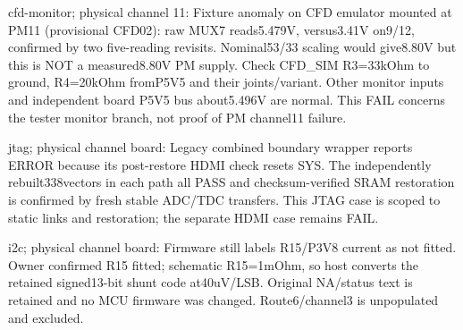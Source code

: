 cfd-\allowbreak{}monito\allowbreak{}r; physic\allowbreak{}al channe\allowbreak{}l 11: Fixtur\allowbreak{}e anomal\allowbreak{}y on CFD emulat\allowbreak{}or mounte\allowbreak{}d at PM11 (provis\allowbreak{}ional CFD02): raw MUX7 reads5\allowbreak{}.479V,\allowbreak{} versus\allowbreak{}3.41V on9/\allowbreak{}12,\allowbreak{} confir\allowbreak{}med by two five-\allowbreak{}readin\allowbreak{}g revisi\allowbreak{}ts. Nomina\allowbreak{}l53/\allowbreak{}33 scalin\allowbreak{}g would give8.80V but this is NOT a measur\allowbreak{}ed8.80V PM supply\allowbreak{}. Check CFD\_\allowbreak{}SIM R3=33kOhm\allowbreak{} to ground\allowbreak{},\allowbreak{} R4=20kOhm\allowbreak{} fromP5\allowbreak{}V5 and their joints\allowbreak{}/\allowbreak{}varian\allowbreak{}t. Other monito\allowbreak{}r inputs\allowbreak{} and indepe\allowbreak{}ndent board P5V5 bus about5\allowbreak{}.496V are normal\allowbreak{}. This FAIL concer\allowbreak{}ns the tester\allowbreak{} monito\allowbreak{}r branch\allowbreak{},\allowbreak{} not proof of PM channe\allowbreak{}l11 failur\allowbreak{}e.

jtag; physic\allowbreak{}al channe\allowbreak{}l board: Legacy\allowbreak{} combin\allowbreak{}ed bounda\allowbreak{}ry wrappe\allowbreak{}r report\allowbreak{}s ERROR becaus\allowbreak{}e its post-\allowbreak{}restor\allowbreak{}e HDMI check resets\allowbreak{} SYS. The indepe\allowbreak{}ndentl\allowbreak{}y rebuil\allowbreak{}t338ve\allowbreak{}ctors in each path all PASS and checks\allowbreak{}um-\allowbreak{}verifi\allowbreak{}ed SRAM restor\allowbreak{}ation is confir\allowbreak{}med by fresh stable\allowbreak{} ADC/\allowbreak{}TDC transf\allowbreak{}ers. This JTAG case is scoped\allowbreak{} to static\allowbreak{} links and restor\allowbreak{}ation; the separa\allowbreak{}te HDMI case remain\allowbreak{}s FAIL.

i2c; physic\allowbreak{}al channe\allowbreak{}l board: Firmwa\allowbreak{}re still labels\allowbreak{} R15/\allowbreak{}P3V8 curren\allowbreak{}t as not fitted\allowbreak{}. Owner confir\allowbreak{}med R15 fitted\allowbreak{}; schema\allowbreak{}tic R15=1mOhm,\allowbreak{} so host conver\allowbreak{}ts the retain\allowbreak{}ed signed\allowbreak{}13-\allowbreak{}bit shunt code at40uV\allowbreak{}/\allowbreak{}LSB. Origin\allowbreak{}al NA/\allowbreak{}status\allowbreak{} text is retain\allowbreak{}ed and no MCU firmwa\allowbreak{}re was change\allowbreak{}d. Route6\allowbreak{}/\allowbreak{}channe\allowbreak{}l3 is unpopu\allowbreak{}lated and exclud\allowbreak{}ed.

